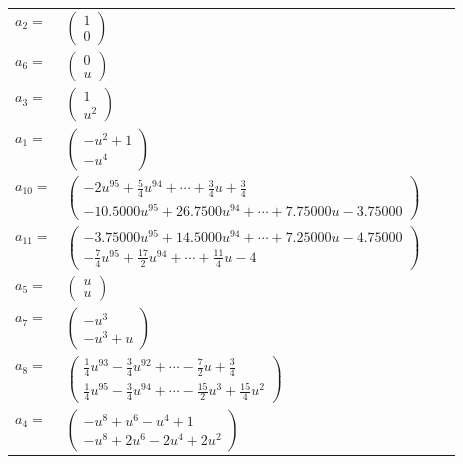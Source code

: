 \documentclass[1p]{elsarticle_modified}
\theoremstyle{definition}
\begin{document}
\begin{tabular}{m{7pt} m{180pt} m{7pt} m{180pt} }
\flushright $a_{2}=$&$\begin{pmatrix}1\\0\end{pmatrix}$ \\
\flushright $a_{6}=$&$\begin{pmatrix}0\\u\end{pmatrix}$ \\
\flushright $a_{3}=$&$\begin{pmatrix}1\\u^2\end{pmatrix}$ \\
\flushright $a_{1}=$&$\begin{pmatrix}- u^2+1\\- u^4\end{pmatrix}$ \\
\flushright $a_{10}=$&$\begin{pmatrix}-2 u^{95}+\frac{5}{4} u^{94}+\cdots+\frac{3}{4} u+\frac{3}{4}\\-10.5000 u^{95}+26.7500 u^{94}+\cdots+7.75000 u-3.75000\end{pmatrix}$ \\
\flushright $a_{11}=$&$\begin{pmatrix}-3.75000 u^{95}+14.5000 u^{94}+\cdots+7.25000 u-4.75000\\-\frac{7}{4} u^{95}+\frac{17}{2} u^{94}+\cdots+\frac{11}{4} u-4\end{pmatrix}$ \\
\flushright $a_{5}=$&$\begin{pmatrix}u\\u\end{pmatrix}$ \\
\flushright $a_{7}=$&$\begin{pmatrix}- u^3\\- u^3+u\end{pmatrix}$ \\
\flushright $a_{8}=$&$\begin{pmatrix}\frac{1}{4} u^{93}-\frac{3}{4} u^{92}+\cdots-\frac{7}{2} u+\frac{3}{4}\\\frac{1}{4} u^{95}-\frac{3}{4} u^{94}+\cdots-\frac{15}{2} u^3+\frac{15}{4} u^2\end{pmatrix}$ \\
\flushright $a_{4}=$&$\begin{pmatrix}- u^8+u^6- u^4+1\\- u^8+2 u^6-2 u^4+2 u^2\end{pmatrix}$ \\

\end{tabular}
\end{document}
